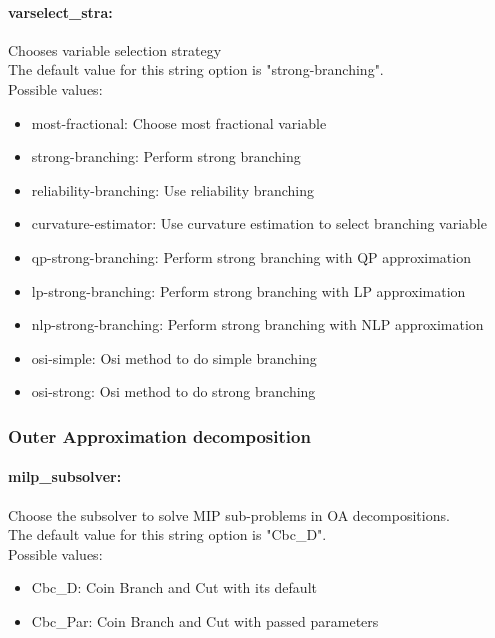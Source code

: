 \paragraph{varselect\_stra:} Chooses variable selection strategy\\
The default value for this string option is "strong-branching".
\\ 
Possible values:
\begin{itemize}
   \item most-fractional: Choose most fractional variable
   \item strong-branching: Perform strong branching
   \item reliability-branching: Use reliability branching
   \item curvature-estimator: Use curvature estimation to select branching
variable
   \item qp-strong-branching: Perform strong branching with QP approximation
   \item lp-strong-branching: Perform strong branching with LP approximation
   \item nlp-strong-branching: Perform strong branching with NLP approximation
   \item osi-simple: Osi method to do simple branching
   \item osi-strong: Osi method to do strong branching
\end{itemize}

\subsubsection{Outer Approximation decomposition}
\label{sec:bonmin_options_:_Options_for_MILP_subsolver_in_OA_decomposition}
\label{sec:bonmin_options_:_Options_for_OA_decomposition}

\paragraph{milp\_subsolver:} Choose the subsolver to solve MIP sub-problems in OA decompositions. $\;$ \\
The default value for this string option is "Cbc\_D".
\\ 
Possible values:
\begin{itemize}
   \item Cbc\_D: Coin Branch and Cut with its default
   \item Cbc\_Par: Coin Branch and Cut with passed parameters
\end{itemize}

